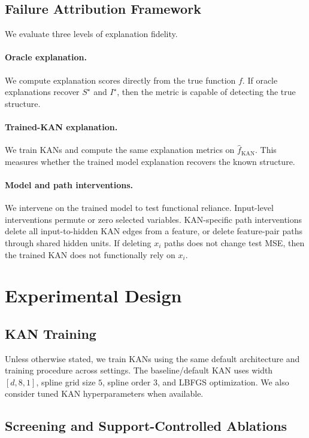 \documentclass[11pt]{article}
\newcommand{\KAN}{\mathrm{KAN}}
\begin{document}
\subsection{Failure Attribution Framework}

We evaluate three levels of explanation fidelity.

\paragraph{Oracle explanation.}
We compute explanation scores directly from the true function $f$.
If oracle explanations recover $S^\star$ and $I^\star$, then the metric is capable of detecting the true structure.

\paragraph{Trained-KAN explanation.}
We train KANs and compute the same explanation metrics on $\hat f_{\KAN}$.
This measures whether the trained model explanation recovers the known structure.

\paragraph{Model and path interventions.}
We intervene on the trained model to test functional reliance.
Input-level interventions permute or zero selected variables.
KAN-specific path interventions delete all input-to-hidden KAN edges from a feature, or delete feature-pair paths through shared hidden units.
If deleting $x_i$ paths does not change test MSE, then the trained KAN does not functionally rely on $x_i$.

\section{Experimental Design}

\subsection{KAN Training}

Unless otherwise stated, we train KANs using the same default architecture and training procedure across settings.
The baseline/default KAN uses width $[d,8,1]$, spline grid size $5$, spline order $3$, and LBFGS optimization.
We also consider tuned KAN hyperparameters when available.

\subsection{Screening and Support-Controlled Ablations}
\end{document}
